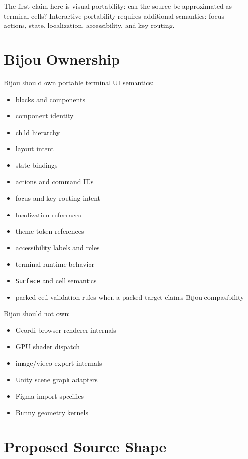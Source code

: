The first claim here is visual portability: can the source be approximated as terminal cells? Interactive portability requires additional semantics: focus, actions, state, localization, accessibility, and key routing.

\section{Bijou Ownership}\label{record-139-bijou-ownership}

Bijou should own portable terminal UI semantics:

\begin{itemize}
\tightlist
\item
  blocks and components
\item
  component identity
\item
  child hierarchy
\item
  layout intent
\item
  state bindings
\item
  actions and command IDs
\item
  focus and key routing intent
\item
  localization references
\item
  theme token references
\item
  accessibility labels and roles
\item
  terminal runtime behavior
\item
  \texttt{S\allowbreak{}u\allowbreak{}r\allowbreak{}f\allowbreak{}a\allowbreak{}c\allowbreak{}e} and cell semantics
\item
  packed-cell validation rules when a packed target claims Bijou compatibility
\end{itemize}

Bijou should not own:

\begin{itemize}
\tightlist
\item
  Geordi browser renderer internals
\item
  GPU shader dispatch
\item
  image/video export internals
\item
  Unity scene graph adapters
\item
  Figma import specifics
\item
  Bunny geometry kernels
\end{itemize}

\section{Proposed Source Shape}\label{record-139-proposed-source-shape}

